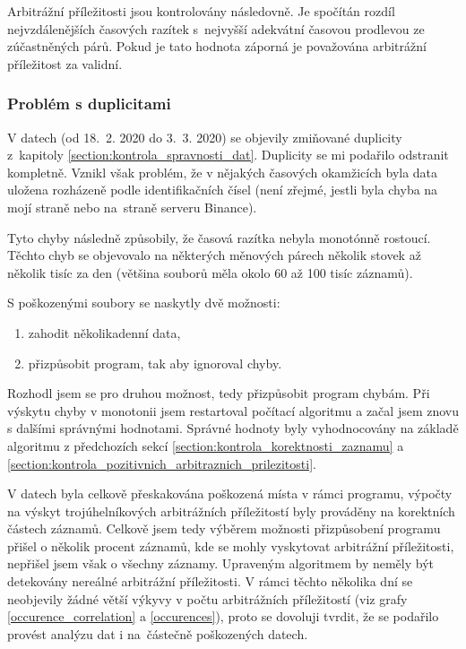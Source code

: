 \documentclass[thesis=B,czech]{FITthesis}[2019/03/21]
\begin{document}
Arbitrážní příležitosti jsou kontrolovány následovně. Je spočítán rozdíl nejvzdálenějších časových razítek s~nejvyšší adekvátní časovou prodlevou ze zúčastněných párů. Pokud je tato hodnota záporná je považována arbitrážní příležitost za validní.

\subsubsection{Problém s duplicitami}
V datech (od 18.~2. 2020 do 3.~3. 2020) se objevily zmiňované duplicity z~kapitoly \ref{section:kontrola_spravnosti_dat}. Duplicity se mi podařilo odstranit kompletně. Vznikl však problém, že v nějakých časových okamžicích byla data uložena rozházeně podle identifikačních čísel (není zřejmé, jestli byla chyba na mojí straně nebo na~straně serveru Binance).

Tyto chyby následně způsobily, že časová razítka nebyla monotónně rostoucí. Těchto chyb se objevovalo na některých měnových párech několik stovek až několik tisíc za den (většina souborů měla okolo 60 až 100 tisíc záznamů). 

S poškozenými soubory se naskytly dvě možnosti:
\begin{enumerate}
    \item zahodit několikadenní data,
    \item přizpůsobit program, tak aby ignoroval chyby.
\end{enumerate}

Rozhodl jsem se pro druhou možnost, tedy přizpůsobit program chybám. Při výskytu chyby v monotonii jsem restartoval počítací algoritmu a začal jsem znovu s dalšími správnými hodnotami. Správné hodnoty byly vyhodnocovány na základě algoritmu z předchozích sekcí \ref{section:kontrola_korektnosti_zaznamu} a \ref{section:kontrola_pozitivnich_arbitraznich_prilezitosti}.

V datech byla celkově přeskakována poškozená místa v rámci programu, výpočty na výskyt trojúhelníkových arbitrážních příležitostí byly prováděny na korektních částech záznamů. Celkově jsem tedy výběrem možnosti přizpůsobení programu přišel o několik procent záznamů, kde se mohly vyskytovat arbitrážní příležitosti, nepřišel jsem však o všechny záznamy. Upraveným algoritmem by neměly být detekovány nereálné arbitrážní příležitosti. V rámci těchto několika dní se neobjevily žádné větší výkyvy v počtu arbitrážních příležitostí (viz grafy \ref{occurence_correlation} a \ref{occurences}), proto se dovoluji tvrdit, že se podařilo provést analýzu dat i na~částečně poškozených datech.
\end{document}
